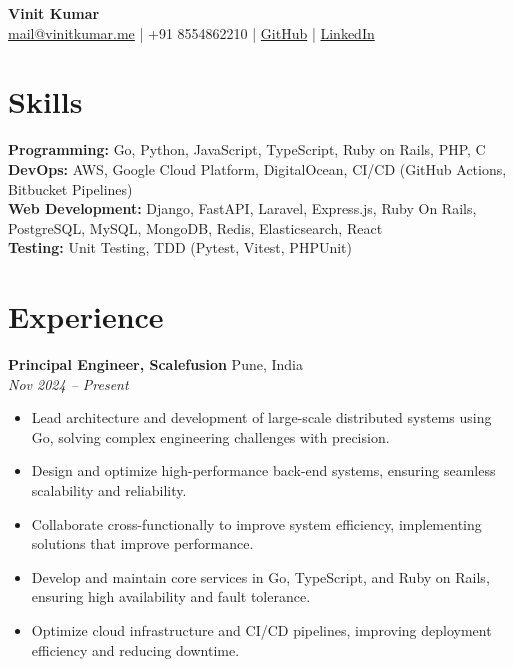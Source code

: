 \documentclass[a4paper,10pt]{article}
\begin{document}
\begin{center}
    {\LARGE \textbf{Vinit Kumar}}\\
    \small \href{mailto:mail@vinitkumar.me}{mail@vinitkumar.me} | +91 8554862210 | 
    \href{https://github.com/vinitkumar}{GitHub} | 
    \href{https://www.linkedin.com/in/vinitatlinkedin/}{LinkedIn}
\end{center}

\section*{Skills}
\textbf{Programming:} Go, Python, JavaScript, TypeScript, Ruby on Rails, PHP, C \\
\textbf{DevOps:} AWS, Google Cloud Platform, DigitalOcean, CI/CD (GitHub Actions, Bitbucket Pipelines) \\
\textbf{Web Development:} Django, FastAPI, Laravel, Express.js, Ruby On Rails, PostgreSQL, MySQL, MongoDB, Redis, Elasticsearch, React \\
\textbf{Testing:} Unit Testing, TDD (Pytest, Vitest, PHPUnit)

\section*{Experience}

\textbf{Principal Engineer, Scalefusion} \hfill Pune, India \\
\textit{Nov 2024 – Present}  
\begin{itemize}[leftmargin=0.15in]
    \item Lead architecture and development of large-scale distributed systems using Go, solving complex engineering challenges with precision.
    \item Design and optimize high-performance back-end systems, ensuring seamless scalability and reliability.
    \item Collaborate cross-functionally to improve system efficiency, implementing solutions that improve performance.
    \item Develop and maintain core services in Go, TypeScript, and Ruby on Rails, ensuring high availability and fault tolerance.
    \item Optimize cloud infrastructure and CI/CD pipelines, improving deployment efficiency and reducing downtime.
\end{itemize}
\end{document}
